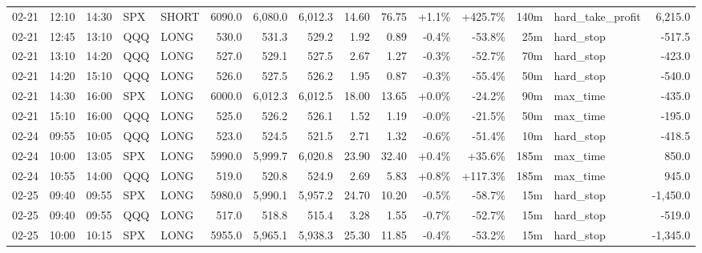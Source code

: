 \documentclass[11pt,a4paper,twoside]{article}
\begin{document}
\begin{landscape}
\begin{center}
\begin{longtable}{>{\color{txtmain}}l l l l l r r r r r r r r >{\color{txtmain}}l r}
02-21 & 12:10 & 14:30 & SPX & SHORT & 6090.0 & 6,080.0 & 6,012.3 & 14.60 & 76.75 & \textcolor{wingreen}{+1.1\%} & \textcolor{wingreen}{+425.7\%} & 140m & hard\_take\_profit & \textcolor{wingreen}{6,215.0} \\
02-21 & 12:45 & 13:10 & QQQ & LONG & 530.0 & 531.3 & 529.2 & 1.92 & 0.89 & \textcolor{lossred}{-0.4\%} & \textcolor{lossred}{-53.8\%} & 25m & hard\_stop & \textcolor{lossred}{-517.5} \\
02-21 & 13:10 & 14:20 & QQQ & LONG & 527.0 & 529.1 & 527.5 & 2.67 & 1.27 & \textcolor{lossred}{-0.3\%} & \textcolor{lossred}{-52.7\%} & 70m & hard\_stop & \textcolor{lossred}{-423.0} \\
02-21 & 14:20 & 15:10 & QQQ & LONG & 526.0 & 527.5 & 526.2 & 1.95 & 0.87 & \textcolor{lossred}{-0.3\%} & \textcolor{lossred}{-55.4\%} & 50m & hard\_stop & \textcolor{lossred}{-540.0} \\
02-21 & 14:30 & 16:00 & SPX & LONG & 6000.0 & 6,012.3 & 6,012.5 & 18.00 & 13.65 & \textcolor{wingreen}{+0.0\%} & \textcolor{lossred}{-24.2\%} & 90m & max\_time & \textcolor{lossred}{-435.0} \\
02-21 & 15:10 & 16:00 & QQQ & LONG & 525.0 & 526.2 & 526.1 & 1.52 & 1.19 & \textcolor{lossred}{-0.0\%} & \textcolor{lossred}{-21.5\%} & 50m & max\_time & \textcolor{lossred}{-195.0} \\
02-24 & 09:55 & 10:05 & QQQ & LONG & 523.0 & 524.5 & 521.5 & 2.71 & 1.32 & \textcolor{lossred}{-0.6\%} & \textcolor{lossred}{-51.4\%} & 10m & hard\_stop & \textcolor{lossred}{-418.5} \\
02-24 & 10:00 & 13:05 & SPX & LONG & 5990.0 & 5,999.7 & 6,020.8 & 23.90 & 32.40 & \textcolor{wingreen}{+0.4\%} & \textcolor{wingreen}{+35.6\%} & 185m & max\_time & \textcolor{wingreen}{850.0} \\
02-24 & 10:55 & 14:00 & QQQ & LONG & 519.0 & 520.8 & 524.9 & 2.69 & 5.83 & \textcolor{wingreen}{+0.8\%} & \textcolor{wingreen}{+117.3\%} & 185m & max\_time & \textcolor{wingreen}{945.0} \\
02-25 & 09:40 & 09:55 & SPX & LONG & 5980.0 & 5,990.1 & 5,957.2 & 24.70 & 10.20 & \textcolor{lossred}{-0.5\%} & \textcolor{lossred}{-58.7\%} & 15m & hard\_stop & \textcolor{lossred}{-1,450.0} \\
02-25 & 09:40 & 09:55 & QQQ & LONG & 517.0 & 518.8 & 515.4 & 3.28 & 1.55 & \textcolor{lossred}{-0.7\%} & \textcolor{lossred}{-52.7\%} & 15m & hard\_stop & \textcolor{lossred}{-519.0} \\
02-25 & 10:00 & 10:15 & SPX & LONG & 5955.0 & 5,965.1 & 5,938.3 & 25.30 & 11.85 & \textcolor{lossred}{-0.4\%} & \textcolor{lossred}{-53.2\%} & 15m & hard\_stop & \textcolor{lossred}{-1,345.0} \\

\end{longtable}
\end{center}
\end{landscape}
\end{document}
